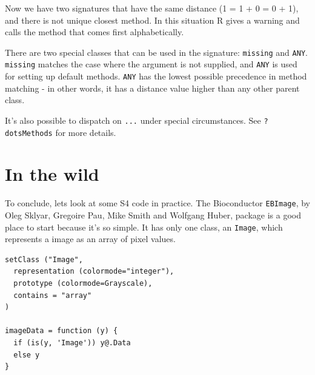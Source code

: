 Now we have two signatures that have the same distance (1 = 1 + 0 = 0 +
1), and there is not unique closest method. In this situation R gives a
warning and calls the method that comes first alphabetically.

There are two special classes that can be used in the signature:
\texttt{missing} and \texttt{ANY}. \texttt{missing} matches the case
where the argument is not supplied, and \texttt{ANY} is used for setting
up default methods. \texttt{ANY} has the lowest possible precedence in
method matching - in other words, it has a distance value higher than
any other parent class.

\begin{Shaded}
\begin{Highlighting}[]
\NormalTok{(}\NormalTok{, }\NormalTok{(}\NormalTok{, }\NormalTok{)}
\NormalTok{(}\NormalTok{, }\NormalTok{(}\NormalTok{, }\NormalTok{)}

\NormalTok{(}\NormalTok{, } \NormalTok{)}
\StringTok{ }\NormalTok{(}\NormalTok{, }\NormalTok{)}

\end{Highlighting}
\end{Shaded}

It's also possible to dispatch on \texttt{...} under special
circumstances. See \texttt{?dotsMethods} for more details.

\section{In the wild}

To conclude, lets look at some S4 code in practice. The Bioconductor
\texttt{EBImage}, by Oleg Sklyar, Gregoire Pau, Mike Smith and Wolfgang
Huber, package is a good place to start because it's so simple. It has
only one class, an \texttt{Image}, which represents a image as an array
of pixel values.

\begin{verbatim}
setClass ("Image",
  representation (colormode="integer"),
  prototype (colormode=Grayscale),
  contains = "array"
)

imageData = function (y) {
  if (is(y, 'Image')) y@.Data
  else y
}    
\end{verbatim}

